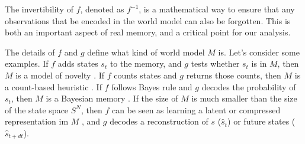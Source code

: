 \documentclass[fleqn,10pt]{wlscirep}
\newtheorem{axiom}{Axiom}
\begin{document}
The invertibility of $f$, denoted as $f^{-1}$, is a mathematical way to ensure that any observations that be encoded in the world model can also be forgotten. This is both an important aspect of real memory, and a critical point for our analysis.

The details of $f$ and $g$ define what kind of world model $M$ is. Let's consider some examples. If $f$ adds states $s_t$ to the memory, and $g$ tests whether $s_t$ is in $M$, then $M$ is a model of novelty \cite{Kakade2002}. If $f$ counts states and $g$ returns those counts, then $M$ is a count-based heuristic \cite{Bellemare2016,Dayan1993}. If $f$ follows Bayes rule and $g$ decodes the probability of $s_t$, then $M$ is a Bayesian memory \cite{Itti2009,Friston2016,Tenenbaum2006,Schmidhuber1991,Pathak2017,Friston2016}. If the size of $M$ is much smaller than the size of the state space $S^N$, then $f$ can be seen as learning a latent or compressed representation im $M$ \cite{Kingma2013,Schmidhuber2008,Levi-Aharoni2019,Ganguli2010,Ha2018,Schmidhuber2015a,Mante2013,Park2017}, and $g$ decodes a reconstruction of $s$ ($\hat s_t$) or future states ($\hat s_{t+dt}$).
 
\end{document}
